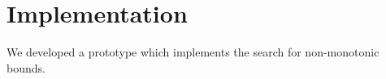 \section{Implementation}

We developed a prototype which implements the search for non-monotonic bounds.
